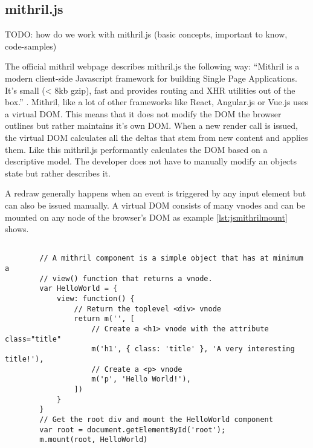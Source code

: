 \subsection{mithril.js}

TODO: how do we work with mithril.js (basic concepts, important to know, code-samples)

The official mithril webpage describes mithril.js the following way: ``Mithril is a modern client-side Javascript framework for building Single Page Applications. It's small (< 8kb gzip), fast and provides routing and XHR utilities out of the box.'' \cite{TODO: mithril.js.org}. Mithril, like a lot of other frameworks like React, Angular.js or Vue.js uses a virtual DOM. This means that it does not modify the DOM the browser outlines but rather maintains it's own DOM. When a new render call is issued, the virtual DOM calculates all the deltas that stem from new content and applies them. Like this mithril.js performantly calculates the DOM based on a descriptive model. The developer does not have to manually modify an objects state but rather describes it.

A redraw generally happens when an event is triggered by any input element but can also be issued manually.
A virtual DOM consists of many vnodes and can be mounted on any node of the browser's DOM as example \ref{lst:jsmithrilmount} shows.

\begin{tcolorbox}[
        title={
            \refstepcounter{listing}
            Listing \thelisting: JavaScript ``Get 2D Rendering Context''
            \label{lst:js2dcontext}
            \addcontentsline{lol}{listing}{\protect\numberline{\thelisting}}
        }
    ]
    \begin{verbatim}

        // A mithril component is a simple object that has at minimum a
        // view() function that returns a vnode.
        var HelloWorld = {
            view: function() {
                // Return the toplevel <div> vnode
                return m('', [
                    // Create a <h1> vnode with the attribute class="title"
                    m('h1', { class: 'title' }, 'A very interesting title!'),
                    // Create a <p> vnode
                    m('p', 'Hello World!'),
                ])
            }
        }
        // Get the root div and mount the HelloWorld component
        var root = document.getElementById('root');
        m.mount(root, HelloWorld)
    \end{verbatim}
\end{tcolorbox}

